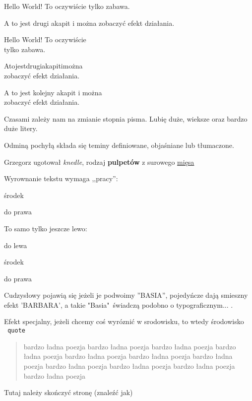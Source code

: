 \documentclass[11pt]{article}
\begin{document}
Hello World! To oczywiście tylko zabawa.

A to jest drugi akapit i można zobaczyć efekt działania.

Hello World! To oczywiście\\
tylko zabawa.

A\hfill to\hfill jest\hfill drugi\hfill akapit\hfill i\hfill można\\
zobaczyć efekt działania.

A to jest kolejny akapit i można\\
zobaczyć efekt działania.

Czasami zależy nam na zmianie stopnia pisma. Lubię {\large duże}, {\Large
 wieksze} oraz {\LARGE bardzo duże} litery.

Odminą pochyłą składa się teminy definiowane, objaśniane lub tłumaczone.

Grzegorz ugotował \emph{knedle}, rodzaj {\bf pulpetów} z surowego \underline{mięsa}

Wyrownanie tekstu wymaga ,,pracy'':

\begin{center}
środek 
\end{center}
\begin{flushright}
do prawa
\end{flushright}

To samo tylko jeszcze lewo:

\begin{flushleft}
do lewa
\end{flushleft}
\begin{center}
środek 
\end{center}
\begin{flushright}
do prawa
\end{flushright}

Cudzysłowy pojawią się jeżeli je podwoimy ''BASIA'', pojedyńcze dają smieszny efekt 'BARBARA', a takie "Basia"\ świadczą podobno o typograficznym... .

Efekt specjalny, jeżeli chcemy coś wyróznić w srodowisku, to wtedy środowisko \texttt{\ quote}

\begin{quote}
bardzo ładna poezja bardzo ładna poezja bardzo ładna poezja bardzo ładna poezja bardzo ładna poezja bardzo ładna poezja bardzo ładna poezja bardzo ładna poezja bardzo ładna poezja bardzo ładna poezja bardzo ładna poezja
\end{quote}


Tutaj należy skończyć stronę (znaleźć jak) 
\end{document}
